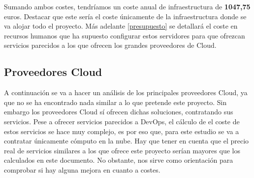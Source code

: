 \begin{text}
		Sumando ambos costes, tendríamos un coste anual de infraestructura de \textbf{1047,75} euros. Destacar que este sería el coste únicamente de la infraestructura donde se va alojar todo el proyecto. Más adelante \ref{presupuesto} se detallará el coste en recursos humanos que ha supuesto configurar estos servidores para que ofrezcan servicios parecidos a los que ofrecen los grandes proveedores de Cloud.
		
	\end{text}
	\subsection{Proveedores Cloud}
		\begin{text}
			A continuación se va a hacer un análisis de los principales proveedores Cloud, ya que no se ha encontrado nada similar a lo que pretende este proyecto. Sin embargo los proveedores Cloud sí ofrecen dichas soluciones, contratando sus servicios. Pese a ofrecer servicios parecidos a DevOps, el cálculo de el coste de estos servicios se hace muy complejo, es por eso que, para este estudio se va a contratar únicamente cómputo en la nube. Hay que tener en cuenta que el precio real de servicios similares a los que ofrece este proyecto serían mayores que los calculados en este documento. No obstante, nos sirve como orientación para comprobar si hay alguna mejora en cuanto a costes.\\
		\end{text}
		
